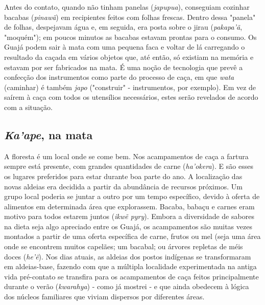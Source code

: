 Antes do contato, quando não tinham panelas (\emph{japupua}), conseguiam
cozinhar bacabas (\emph{pinawã}) em recipientes feitos com folhas
frescas. Dentro dessa "panela" de folhas, despejavam água e, em seguida,
era posta sobre o jirau (\emph{pakapa'ã}, "moquém"); em poucos minutos
as bacabas estavam prontas para o consumo. Os Guajá podem sair à mata
com uma pequena faca e voltar de lá carregando o resultado da caçada em
vários objetos que, até então, só existiam na memória e estavam por ser
fabricados na mata. É uma noção de tecnologia que prevê a confecção dos
instrumentos como parte do processo de caça, em que \emph{wata}
(caminhar) é também \emph{japo} ("construir" - instrumentos, por
exemplo). Em vez de saírem à caça com todos os utensílios necessários,
estes serão revelados de acordo com a situação.

\hypertarget{kaape-na-mata}{%
\subsection{\texorpdfstring{\emph{Ka'ape}, na
mata}{Ka'ape, na mata}}\label{kaape-na-mata}}

A floresta é um local onde se come bem. Nos acampamentos de caça a
fartura sempre está presente, com grandes quantidades de carne
(\emph{ha'okera}). E são esses os lugares preferidos para estar durante
boa parte do ano. A localização das novas aldeias era decidida a partir
da abundância de recursos próximos. Um grupo local poderia se juntar a
outro por um tempo específico, devido à oferta de alimentos em
determinada área que explorassem. Bacaba, babaçu e carnes eram motivo
para todos estarem juntos (\emph{ikwẽ pyry}). Embora a diversidade de
sabores na dieta seja algo apreciado entre os Guajá, os acampamentos são
muitas vezes montados a partir de uma oferta específica de carne, frutos
ou mel (seja uma área onde se encontrem muitos capelães; um bacabal; ou
árvores repletas de méis doces (\emph{he'ẽ}). Nos dias atuais, as
aldeias dos postos indígenas se transformaram em aldeias-base, fazendo
com que a múltipla localidade experimentada na antiga vida pré-contato
se transfira para os acampamentos de caça feitos principalmente durante
o verão (\emph{kwarahya}) - como já mostrei - e que ainda obedecem à
lógica dos núcleos familiares que viviam dispersos por diferentes áreas.

